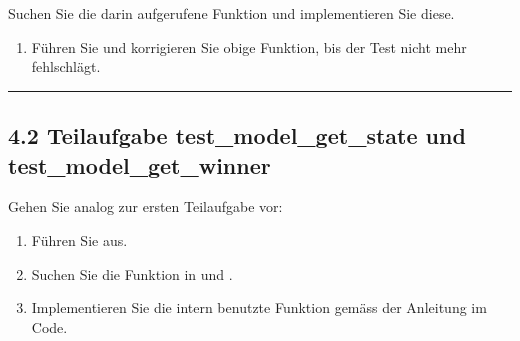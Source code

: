 \documentclass[a4paper,10pt,english]{report}
\begin{document}
\sphinxAtStartPar
Suchen Sie die darin aufgerufene  Funktion und implementieren Sie diese.

\begin{sphinxVerbatim}[commandchars=\\\{\}]
  





\end{sphinxVerbatim}
\begin{enumerate}
%
\item {} 
\sphinxAtStartPar
Führen Sie  und korrigieren Sie obige Funktion, bis der Test nicht mehr fehlschlägt.

\end{enumerate}


\bigskip\hrule\bigskip



\subsection{4.2 Teilaufgabe test\_model\_get\_state und test\_model\_get\_winner}
\label{\detokenize{P05_TicTacToe/README:teilaufgabe-test-model-get-state-und-test-model-get-winner}}
\sphinxAtStartPar
Gehen Sie analog zur ersten Teilaufgabe vor:
\begin{enumerate}
%
\item {} 
\sphinxAtStartPar
Führen Sie  aus.

\item {} 
\sphinxAtStartPar
Suchen Sie die Funktion  in  und .

\item {} 
\sphinxAtStartPar
Implementieren Sie die intern benutzte Funktion  gemäss der Anleitung im Code.

\end{enumerate}
\end{document}
